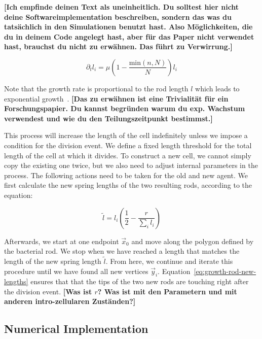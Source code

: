 \documentclass{article}
\begin{document}
\textbf{[Ich empfinde deinen Text als uneinheitlich. Du solltest hier nicht deine Softwareimplementation beschreiben, sondern das was du tatsächlich in den Simulationen benutzt hast. Also Möglichkeiten, die du in deinem Code angelegt hast, aber für das Paper nicht verwendet hast, brauchst du nicht zu erwähnen. Das führt zu Verwirrung.]}

\begin{equation}
    \partial_t l_i = \mu\left(1-\frac{\text{min}(n,N)}{N}\right)l_i
    \label{eq:growth-rod-lengths}
\end{equation}

Note that the growth rate is proportional to the rod length $l$ which leads to exponential
growth~\cite{Robert2014,Takeuchi2005}.
\textbf{[Das zu erwähnen ist eine Trivialität für ein Forschungspapier. Du kannst begründen warum du exp. Wachstum verwendest und wie du den Teilungszeitpunkt bestimmst.]}

This process will increase the length of the cell indefinitely unless we impose a condition for the
division event. We define a fixed length threshold for the total length of the cell at which it divides.
To construct a new cell, we cannot simply copy the existing one twice, but we also need to adjust
internal parameters in the process.
The following actions need to be taken for the old and new agent.
We first calculate the new spring lengths of the two resulting rods, according to the equation:

\begin{equation}
    \tilde{l} = l_i\left(\frac{1}{2} - \frac{r}{\sum\limits_i l_i}\right)
    \label{eq:growth-rod-new-lengths}
\end{equation}

Afterwards, we start at one endpoint $\vec{x}_0$ and move along the polygon defined by the
bacterial rod. We stop when we have reached a length that matches the length of the new spring length $\tilde{l}$.
From here, we continue and iterate this procedure until we have found all new vertices $\vec{y}_i$.
Equation~\ref{eq:growth-rod-new-lengths} ensures that that the tips of the two new rods are touching
right after the division event.
\textbf{[Was ist $r$? Was ist mit den Parametern und mit anderen intro-zellularen Zuständen?]}

\subsection{Numerical Implementation}
\end{document}
